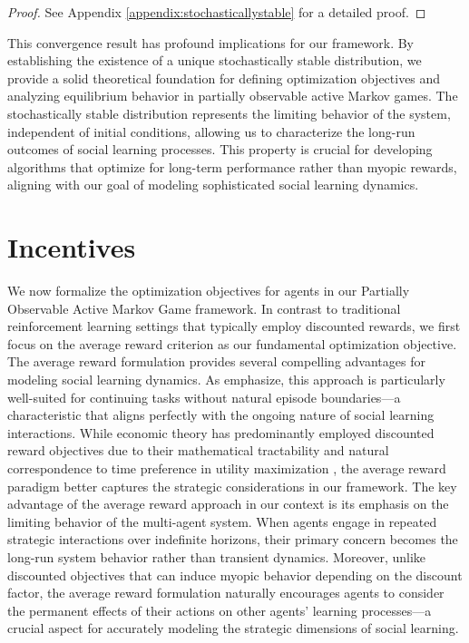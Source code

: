 \begin{proof}
    See Appendix \ref{appendix:stochasticallystable} for a detailed proof.
\end{proof}
This convergence result has profound implications for our framework. By establishing the existence of a unique stochastically stable distribution, we provide a solid theoretical foundation for defining optimization objectives and analyzing equilibrium behavior in partially observable active Markov games. The stochastically stable distribution represents the limiting behavior of the system, independent of initial conditions, allowing us to characterize the long-run outcomes of social learning processes. This property is crucial for developing algorithms that optimize for long-term performance rather than myopic rewards, aligning with our goal of modeling sophisticated social learning dynamics.

\section{Incentives}
We now formalize the optimization objectives for agents in our Partially Observable Active Markov Game framework. In contrast to traditional reinforcement learning settings that typically employ discounted rewards, we first focus on the average reward criterion as our fundamental optimization objective.
The average reward formulation provides several compelling advantages for modeling social learning dynamics. As \citet{sutton2018reinforcement} emphasize, this approach is particularly well-suited for continuing tasks without natural episode boundaries—a characteristic that aligns perfectly with the ongoing nature of social learning interactions. While economic theory has predominantly employed discounted reward objectives due to their mathematical tractability and natural correspondence to time preference in utility maximization \citep{koopmans1960stationary, stokey1989recursive}, the average reward paradigm better captures the strategic considerations in our framework.
The key advantage of the average reward approach in our context is its emphasis on the limiting behavior of the multi-agent system. When agents engage in repeated strategic interactions over indefinite horizons, their primary concern becomes the long-run system behavior rather than transient dynamics. Moreover, unlike discounted objectives that can induce myopic behavior depending on the discount factor, the average reward formulation naturally encourages agents to consider the permanent effects of their actions on other agents' learning processes—a crucial aspect for accurately modeling the strategic dimensions of social learning.

